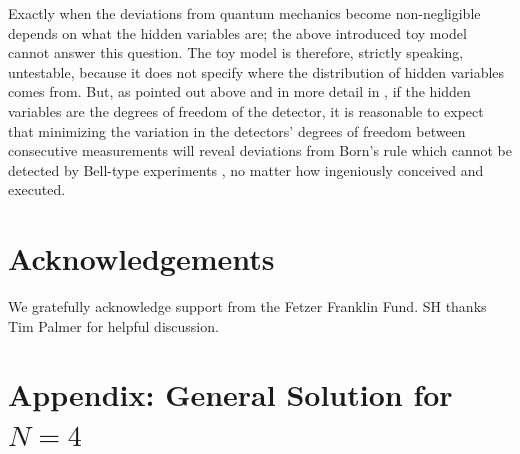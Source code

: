 \documentclass[11pt,twoside,A4]{article}
\begin{document}
Exactly when the deviations from quantum mechanics become non-negligible depends on what the hidden variables are; the above introduced toy model cannot answer this question. The toy model is therefore, strictly speaking, untestable, because it does not specify where the distribution of hidden variables comes from. But, as pointed out above and in more detail in \cite{Hossenfelder:2011ct,Hossenfelder:2019shy}, if the hidden variables are the degrees of freedom of the detector, it is reasonable to expect that
minimizing the variation in the detectors' degrees of freedom between consecutive measurements will reveal deviations from Born's rule which cannot be detected by Bell-type experiments \cite{Leung:2017ndn,bigbell,Friedman:2018byq}, no matter how ingeniously conceived and executed. 

 

\section*{Acknowledgements}

We gratefully acknowledge support from the Fetzer Franklin Fund. SH thanks Tim Palmer for helpful discussion.

\clearpage

\section*{Appendix: General Solution for $N=4$}
%
\end{document}
